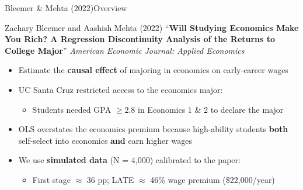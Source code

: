 \documentclass[hyperref={pdfpagelabels=false}]{beamer}
\begin{document}
\begin{frame}{Bleemer \& Mehta (2022)}{Overview}

	Zachary Bleemer and Aashish Mehta (2022) ``\textbf{Will Studying Economics Make You Rich? A Regression Discontinuity Analysis of the Returns to College Major}'' \textit{American Economic Journal: Applied Economics}

	\vspace{0.2cm}
	\begin{itemize}
		\item Estimate the \textbf{causal effect} of majoring in economics on early-career wages
		\vspace{0.2cm}
		\item UC Santa Cruz restricted access to the economics major:
		\begin{itemize}
			\vspace{0.2cm}
			\item Students needed GPA $\geq 2.8$ in Economics 1 \& 2 to declare the major
			\vspace{0.2cm}
		\end{itemize}
		\item OLS overstates the economics premium because high-ability students
		\textbf{both} self-select into economics \textbf{and} earn higher wages
		\vspace{0.2cm}
		\item We use \textbf{simulated data} (N = 4,000) calibrated to the paper:
		\begin{itemize}
			\vspace{0.2cm}
			\item First stage $\approx$ 36 pp; LATE $\approx$ 46\% wage premium (\$22,000/year)
		\end{itemize}
	\end{itemize}
\end{frame}
\end{document}
